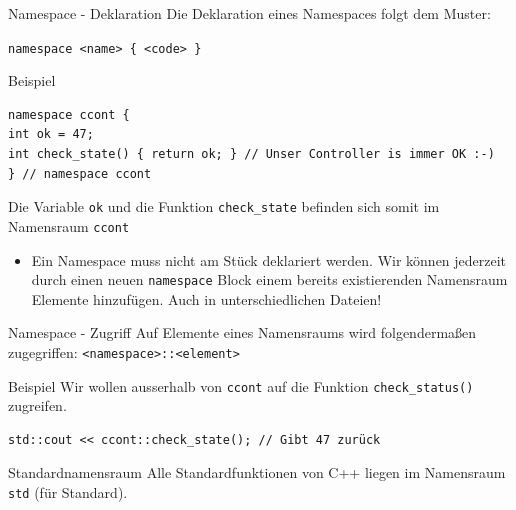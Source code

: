 \documentclass[presentation]{beamer}
\begin{document}
\begin{frame}[fragile,label={sec:org6552fd4}]{Namespace - Deklaration}
 Die Deklaration eines Namespaces folgt dem Muster:

{\color{solarizedYellow}\texttt{namespace <name> \{ <code> \}}}
\begin{block}{Beispiel}
\begin{verbatim}
namespace ccont {
int ok = 47;
int check_state() { return ok; } // Unser Controller is immer OK :-)
} // namespace ccont
\end{verbatim}
Die Variable {\color{solarizedYellow}\texttt{ok} }und die Funktion {\color{solarizedYellow}\texttt{check\_state} }befinden sich somit
im Namensraum {\color{solarizedYellow}\texttt{ccont}}
\end{block}
\begin{itemize}
\item Ein Namespace muss nicht am Stück deklariert werden. Wir können
jederzeit durch einen neuen {\color{solarizedYellow}\texttt{namespace} }Block einem bereits
existierenden Namensraum \alert{Elemente hinzufügen}. Auch in
\alert{unterschiedlichen Dateien}!
\end{itemize}
\end{frame}
\begin{frame}[fragile,label={sec:org9c05804}]{Namespace - Zugriff}
 Auf Elemente eines Namensraums wird folgendermaßen zugegriffen:
{\color{solarizedYellow}\texttt{<namespace>::<element>}}
\begin{block}{Beispiel}
Wir wollen ausserhalb von {\color{solarizedYellow}\texttt{ccont} }auf die Funktion {\color{solarizedYellow}\texttt{check\_status()}}
zugreifen.
\begin{verbatim}
std::cout << ccont::check_state(); // Gibt 47 zurück
\end{verbatim}
\end{block}
\begin{block}{Standardnamensraum}
Alle Standardfunktionen von C++ liegen im Namensraum {\color{solarizedYellow}\texttt{std} }(für
Standard).
\end{block}
\end{frame}
\end{document}

